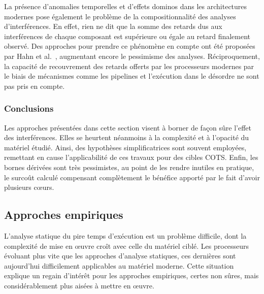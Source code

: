 La présence d'anomalies temporelles et d'effets dominos dans les architectures modernes pose également le problème de la compositionnalité des analyses d'interférences.
En effet, rien ne dit que la somme des retards dus aux interférences de chaque composant est supérieure ou égale au retard finalement observé.
Des approches pour prendre ce phénomène en compte ont été proposées par Hahn et al.~\cite{hahn2016enabling}, augmentant encore le pessimisme des analyses.
Réciproquement, la capacité de recouvrement des retards offerts par les processeurs modernes par le biais de mécanismes comme les pipelines et l'exécution dans le désordre ne sont pas pris en compte.

\subsubsection{Conclusions}

Les approches présentées dans cette section visent à borner de façon sûre l'effet des interférences.
Elles se heurtent néanmoins à la complexité et à l'opacité du matériel étudié.
Ainsi, des hypothèses simplificatrices sont souvent employées, remettant en cause l'applicabilité de ces travaux pour des cibles COTS.
Enfin, les bornes dérivées sont très pessimistes, au point de les rendre inutiles en pratique, le surcoût calculé compensant complètement le bénéfice apporté par le fait d'avoir plusieurs cœurs.

\subsection{Approches empiriques}

L'analyse statique du pire temps d'exécution est un problème difficile, dont la complexité de mise en œuvre croît avec celle du matériel ciblé.
Les processeurs évoluant plus vite que les approches d'analyse statiques, ces dernières sont aujourd'hui difficilement applicables au matériel moderne.
Cette situation explique un regain d'intérêt pour les approches empiriques, certes non sûres, mais considérablement plus aisées à mettre en œuvre.


